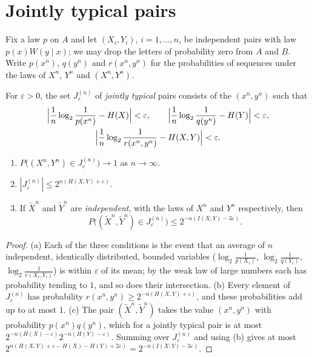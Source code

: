 \section{Jointly typical pairs}\label{sec:jointtypical}

Fix a law $p$ on $A$ and let $(X_i,Y_i)$, $i=1,\dots,n$, be independent pairs with law $p(x)W(y\mid x)$; we may drop the letters of probability zero from $A$ and $B$. Write $p(x^n)$, $q(y^n)$ and $r(x^n,y^n)$ for the probabilities of sequences under the laws of $X^n$, $Y^n$ and $(X^n,Y^n)$.

\begin{definition}\label{def:jointtypical}
For $\varepsilon>0$, the set $J_\varepsilon^{(n)}$ of \emph{jointly typical} pairs consists of the $(x^n,y^n)$ such that
\[
\begin{gathered}
\Bigl|\frac1n\log_2\frac1{p(x^n)}-H(X)\Bigr|<\varepsilon,\qquad\Bigl|\frac1n\log_2\frac1{q(y^n)}-H(Y)\Bigr|<\varepsilon,\\
\Bigl|\frac1n\log_2\frac1{r(x^n,y^n)}-H(X,Y)\Bigr|<\varepsilon.
\end{gathered}
\]
\end{definition}

\begin{lemma}\label{lem:jointtypical}
\begin{enumerate}[label=(\alph*)]
\item $P\bigl((X^n,Y^n)\in J_\varepsilon^{(n)}\bigr)\to1$ as $n\to\infty$.
\item $|J_\varepsilon^{(n)}|\le2^{n(H(X,Y)+\varepsilon)}$.
\item If $\tilde X^n$ and $\tilde Y^n$ are \emph{independent}, with the laws of $X^n$ and $Y^n$ respectively, then
\[
P\bigl((\tilde X^n,\tilde Y^n)\in J_\varepsilon^{(n)}\bigr)\le2^{-n(I(X;Y)-3\varepsilon)}.
\]
\end{enumerate}
\end{lemma}

\begin{proof}
(a) Each of the three conditions is the event that an average of $n$ independent, identically distributed, bounded variables ($\log_2\frac1{p(X_i)}$, $\log_2\frac1{q(Y_i)}$, $\log_2\frac1{r(X_i,Y_i)}$) is within $\varepsilon$ of its mean; by the weak law of large numbers each has probability tending to $1$, and so does their intersection. (b) Every element of $J_\varepsilon^{(n)}$ has probability $r(x^n,y^n)\ge2^{-n(H(X,Y)+\varepsilon)}$, and these probabilities add up to at most $1$. (c) The pair $(\tilde X^n,\tilde Y^n)$ takes the value $(x^n,y^n)$ with probability $p(x^n)q(y^n)$, which for a jointly typical pair is at most $2^{-n(H(X)-\varepsilon)}2^{-n(H(Y)-\varepsilon)}$. Summing over $J_\varepsilon^{(n)}$ and using (b) gives at most $2^{n(H(X,Y)+\varepsilon-H(X)-H(Y)+2\varepsilon)}=2^{-n(I(X;Y)-3\varepsilon)}$.
\end{proof}

